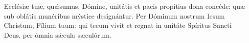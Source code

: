 Ecclésiæ tuæ, quǽsumus, Dómine, unitátis et pacis propítius dona concéde: quæ sub oblátis munéribus mýstice designántur.
Per Dóminum nostrum Iesum Christum, Fílium tuum: qui tecum vivit et regnat in unitáte Spíritus Sancti Deus, per ómnia sǽcula sæculórum.
